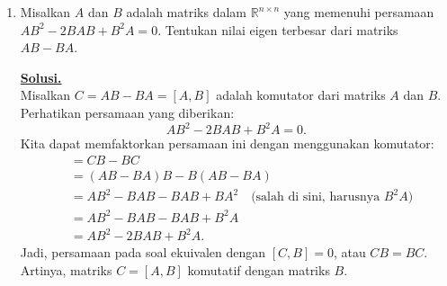 \documentclass[12pt,twoside]{article}
\newenvironment{solution}
{
	\par\noindent\textbf{\underline{Solusi.}}\\
}
{
	\par
}
\begin{document}
\begin{enumerate}
  \item Misalkan $A$ dan $B$ adalah matriks dalam $\mathbb{R}^{n\times n}$ yang memenuhi persamaan
        $AB^2 - 2BAB+B^2A = 0$.	Tentukan nilai eigen terbesar dari matriks $AB-BA$.
        \begin{solution}
          Misalkan $C = AB - BA = [A, B]$ adalah komutator dari matriks $A$ dan $B$.
          Perhatikan persamaan yang diberikan:
          \[ AB^2 - 2BAB + B^2A = 0. \]
          Kita dapat memfaktorkan persamaan ini dengan menggunakan komutator:
          \begin{align*}
            [C, B] & = CB - BC                                                               \\
                   & = (AB - BA)B - B(AB - BA)                                               \\
                   & = AB^2 - BAB - BAB + BA^2 \quad \text{(salah di sini, harusnya $B^2A$)} \\
                   & = AB^2 - BAB - BAB + B^2A                                               \\
                   & = AB^2 - 2BAB + B^2A.
          \end{align*}
          Jadi, persamaan pada soal ekuivalen dengan $[C, B] = 0$, atau $CB = BC$.
          Artinya, matriks $C = [A, B]$ komutatif dengan matriks $B$.


\end{solution}
\end{enumerate}
\end{document}
